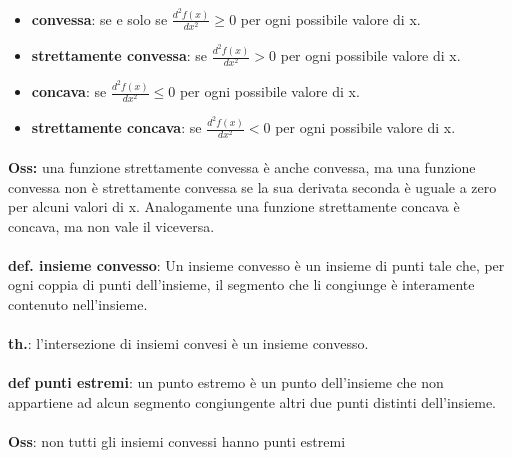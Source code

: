 \documentclass[a4paper, 11pt]{article}
\begin{document}
            \begin{itemize}
                \item \textbf{convessa}: se e solo se $\frac{d^2 f(x)}{dx^2} \ge 0$ per ogni possibile valore di x.
                \item \textbf{strettamente convessa}: se $\frac{d^2 f(x)}{dx^2} > 0$ per ogni possibile valore di x.
                \item \textbf{concava}: se $\frac{d^2 f(x)}{dx^2} \le 0$ per ogni possibile valore di x.
                \item \textbf{strettamente concava}: se $\frac{d^2 f(x)}{dx^2} < 0$ per ogni possibile valore di x.
            \end{itemize}

            \paragraph{}
            \textbf{Oss:} una funzione strettamente convessa è anche convessa, ma una funzione convessa non è strettamente convessa se la sua derivata seconda è uguale a zero per alcuni valori di x. 
            Analogamente una funzione strettamente concava è concava, ma non vale il viceversa.

            \paragraph{}
            \textbf{def. insieme convesso}: Un insieme convesso è un insieme di punti tale che, per ogni coppia di punti dell'insieme, il segmento che li congiunge è interamente contenuto nell'insieme.

            \paragraph{}
            \textbf{th.}: l'intersezione di insiemi convesi è un insieme convesso.
            \paragraph{}
            \textbf{def punti estremi}: un punto estremo è un punto dell'insieme che non appartiene ad alcun segmento congiungente altri due punti distinti dell'insieme. 

            \paragraph{}
            \textbf{Oss}: non tutti gli insiemi convessi hanno punti estremi 
\end{document}
